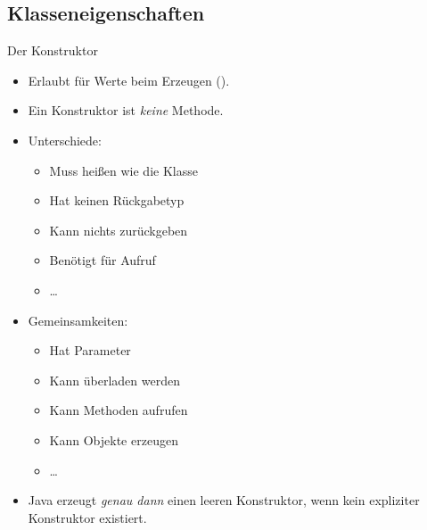{\subsection{Klasseneigenschaften}
\begin{frame}{Der Konstruktor}
\begin{itemize}[<+(1)->]
   \itemsep6pt
   \item Erlaubt für Werte beim Erzeugen ().
   \item Ein Konstruktor ist \textit{keine} Methode.\vspace*{-\topsep}
\end{itemize}
\begin{multicols}{2}
\begin{itemize}[<+(1)->]
   \item Unterschiede: \begin{itemize}
      \item Muss heißen wie die Klasse
      \item Hat keinen Rückgabetyp
      \item Kann nichts zurückgeben
      \item Benötigt  für Aufruf
      \item \ldots
   \end{itemize}
   \item Gemeinsamkeiten:
   \begin{itemize}
      \item Hat Parameter
      \item Kann überladen werden
      \item Kann Methoden aufrufen
      \item Kann Objekte erzeugen
      \item \ldots
   \end{itemize}
\end{itemize}
\end{multicols}
\begin{itemize}[<+(1)->]
   \item Java erzeugt \textit{genau dann} einen leeren Konstruktor, wenn kein expliziter Konstruktor existiert.
\end{itemize}
\end{frame}


}
